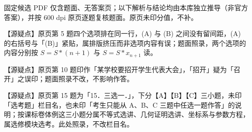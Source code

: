 \begin{gktip}
固定候选 PDF 仅含题面、无答案页；以下解析与结论均由本库独立推导（非官方答案），并按 600 dpi 原页逐题复核题面。原页未印分值，不补。

【源疑点】原页第 5 题四个选项排在同一行，(A) 与 (B) 之间没有留间距，(A) 的右括号与「(B)」紧贴，属排版挤压而非选项内容有误；题面照录，两个选项的内容分别按 $S=S*(n+1)$ 与 $S=S*x_{n+1}$ 读。

【源疑点】原页第 10 题印作「某学校要招开学生代表大会」，「招开」疑为「召开」之误印；题面照录不改，不影响作答。

【源疑点】原页第 15 题为「15．三选一．」，下分【A】【B】【C】三小题，未印「选考题」栏目名，也未印「考生只能从 A、B、C 三题中任选一题作答」的说明；按课标卷体例这三小题分属不等式选讲、几何证明选讲、坐标系与参数方程，属选修模块选考。此处照录，不改栏目名。
\end{gktip}

